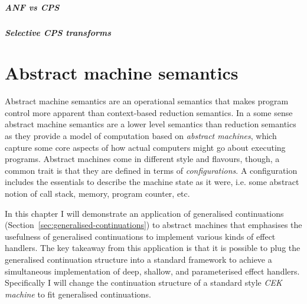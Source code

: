 \documentclass[12pt,phd,lfcs,twoside,openright,logo,leftchapter,normalheadings]{infthesis}
\theoremstyle{plain}
\theoremstyle{definition}
\begin{document}



\paragraph{ANF vs CPS}

\paragraph{Selective CPS transforms}
\citet{Nielsen01} \citet{DanvyH92} \citet{DanvyH93} \citet{Leijen17}

\chapter{Abstract machine semantics}
\label{ch:abstract-machine}

Abstract machine semantics are an operational semantics that makes
program control more apparent than context-based reduction
semantics. In a some sense abstract machine semantics are a lower
level semantics than reduction semantics as they provide a model of
computation based on \emph{abstract machines}, which capture some core
aspects of how actual computers might go about executing programs.
%
Abstract machines come in different style and flavours, though, a
common trait is that they are defined in terms of
\emph{configurations}. A configuration includes the essentials to
describe the machine state as it were, i.e. some abstract notion of
call stack, memory, program counter, etc.

In this chapter I will demonstrate an application of generalised
continuations (Section~\ref{sec:generalised-continuations}) to
abstract machines that emphasises the usefulness of generalised
continuations to implement various kinds of effect handlers. The key
takeaway from this application is that it is possible to plug the
generalised continuation structure into a standard framework to
achieve a simultaneous implementation of deep, shallow, and
parameterised effect handlers.
%
Specifically I will change the continuation structure of a standard
\citeauthor{FelleisenF86} style \emph{CEK machine} to fit generalised
continuations.
\end{document}
